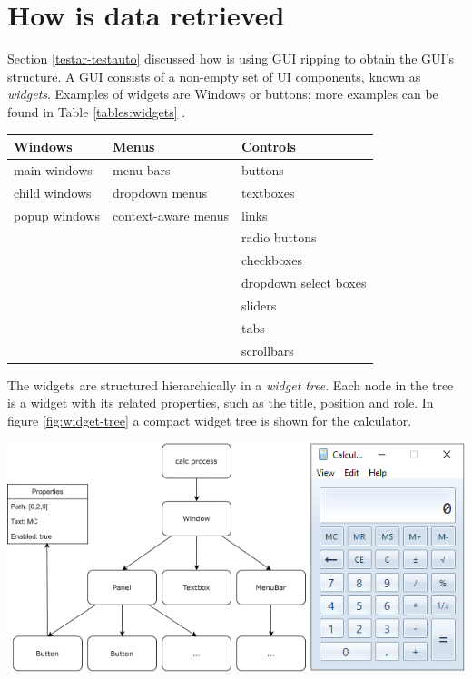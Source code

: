 \section{How is data retrieved} \label{data-retrieval}

Section \ref{testar-testauto} discussed how \testar is using GUI ripping to obtain the GUI's structure. A GUI consists of a non-empty set of UI components, known as \emph{widgets}. Examples of widgets are Windows or buttons; more examples can be found in Table \ref{tables:widgets} \cite{VosAho2021}. 

\begingroup
\captionsetup{type=table}
\begin{tabularx}{\textwidth}{ 
  | >{\raggedright\arraybackslash}X 
  | >{\raggedright\arraybackslash}X 
  | >{\raggedright\arraybackslash}X | }
    \hline
    Windows & Menus & Controls \\
    \hline
    \hline
    main windows & menu bars & buttons \\
    child windows & dropdown menus & textboxes \\
    popup windows & context-aware menus & links \\
    && radio buttons \\
    && checkboxes\\
    && dropdown select boxes\\
    && sliders\\
    && tabs\\
    && scrollbars \\
    \hline
\end{tabularx}
\label{tables:widgets}
\endgroup

The widgets are structured hierarchically in a \emph{widget tree}. Each node in the tree is a widget with its related properties, such as the title, position and role. In figure \ref{fig:widget-tree} a compact widget tree is shown for the calculator.

\bigskip
\begingroup
\captionsetup{type=figure}
\includegraphics[scale=0.6]{images/calc-tree.png}
\label{fig:widget-tree}
\endgroup

